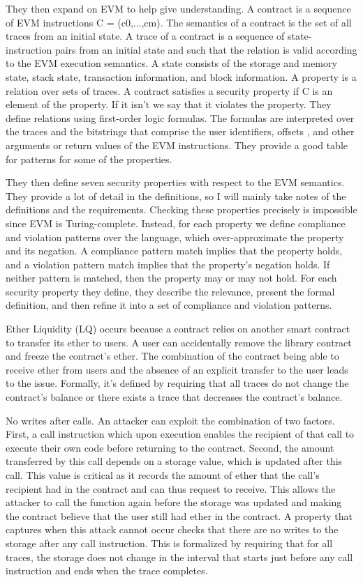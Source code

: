 \documentclass{article}
\begin{document}
They then expand on EVM to help give understanding. A contract is a sequence of EVM instructions C = (c0,...,cm). The semantics of a contract is the set of all traces from an initial state. A trace of a contract is a sequence of state-instruction pairs from an initial state and such that the relation is valid according to the EVM execution semantics. A state consists of the storage and memory state, stack state, transaction information, and block information. A property is a relation over sets of traces. A contract satisfies a security property if C is an element of the property. If it isn't we say that it violates the property. They define relations using first-order logic formulas. The formulas are interpreted over the traces and the bitstrings that comprise the user identifiers, offsets , and other arguments or return values of the EVM instructions. They provide a good table for patterns for some of the properties.

They then define seven security properties with respect to the EVM semantics. They provide a lot of detail in the definitions, so I will mainly take notes of the definitions and the requirements. Checking these properties precisely is impossible since EVM is Turing-complete. Instead, for each property we define compliance and violation patterns over the language, which over-approximate the property and its negation. A compliance pattern match implies that the property holds, and a violation pattern match implies that the property's negation holds. If neither pattern is matched, then the property may or may not hold. For each security property they define, they describe the relevance, present the formal definition, and then refine it into a set of compliance and violation patterns.

Ether Liquidity (LQ) occurs because a contract relies on another smart contract to transfer its ether to users. A user can accidentally remove the library contract and freeze the contract's ether. The combination of the contract being able to receive ether from users and the absence of an explicit transfer to the user leads to the issue. Formally, it's defined by requiring that all traces do not change the contract's balance or there exists a trace that decreases the contract's balance.

No writes after calls. An attacker can exploit the combination of two factors. First, a call instruction which upon execution enables the recipient of that call to execute their own code before returning to the contract. Second, the amount transferred by this call depends on a storage value, which is updated after this call. This value is critical as it records the amount of ether that the call's recipient had in the contract and can thus request to receive. This allows the attacker to call the function again before the storage was updated and making the contract believe that the user still had ether in the contract. A property that captures when this attack cannot occur checks that there are no writes to the storage after any call instruction. This is formalized by requiring that for all traces, the storage does not change in the interval that starts just before any call instruction and ends when the trace completes.
\end{document}
